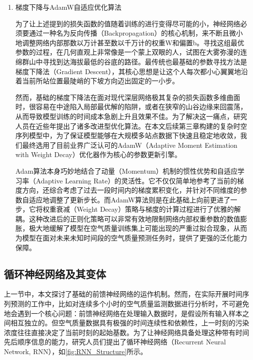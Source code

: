 \begin{enumerate}[label=（\arabic*）, leftmargin=0pt, itemindent=4.5em, labelsep=0.5em, listparindent=2em, parsep=0pt]
    \item 梯度下降与AdamW自适应优化算法
    
    为了让上述提到的损失函数的值随着训练的进行变得尽可能的小，神经网络必须要通过一种名为反向传播（Backpropagation）的核心机制，来不断且微小地调整网络内部那数以万计甚至数以千万计的权重W和偏置b。寻找这组最优参数的过程，在几何直观上非常像是一个蒙上双眼的人，试图在大雾弥漫的连绵群山中寻找到达海拔最低的谷底的路径。最传统也最基础的参数寻找方法是梯度下降法（Gradient Descent），其核心思想是让这个人每次都小心翼翼地沿着当前所站位置最陡峭的下坡方向迈出固定的一小步。

    然而，基础的梯度下降法在面对现代深层网络极其复杂的损失函数多维曲面时，很容易在中途陷入局部最优解的陷阱，或者在狭窄的山谷边缘来回震荡，从而导致模型训练的时间成本急剧上升且效果不佳。为了解决这一痛点，研究人员在近些年提出了诸多改进型优化算法。在本文后续第三章构建的复杂时空序列模型中，为了保证模型能够在大规模多站点数据下快速且稳定地收敛，我们最终选用了目前业界广泛认可的AdamW（Adaptive Moment Estimation with Weight Decay）优化器作为核心的参数更新引擎。

    Adam算法本身巧妙地结合了动量（Momentum）机制的惯性优势和自适应学习率（Adaptive Learning Rate）的灵活性。它不仅仅简单地参考了当前的梯度方向，还综合考虑了过去一段时间内的梯度累积变化，并针对不同维度的参数自适应地调整了更新步长。而AdamW算法则是在此基础上向前更进了一步，它将权重衰减（Weight Decay）策略与梯度的计算过程进行了优雅的解耦。这种改进后的正则化策略可以非常有效地限制网络内部权重参数的数值膨胀，极大地缓解了模型在空气质量训练集上可能出现的严重过拟合现象，从而为模型在面对未来未知时间段的空气质量预测任务时，提供了更强的泛化能力保障。

\end{enumerate}

\subsection{循环神经网络及其变体}

上一节中，本文探讨了基础的前馈神经网络的运作机制。然而，在实际开展时间序列预测的工作中，比如对连续多个小时的空气质量监测数据进行分析时，不可避免地会遇到一个核心问题：前馈神经网络在处理输入数据时，是假设所有输入样本之间相互独立的。但空气质量数据具有极强的时间连续性和依赖性，上一时刻的污染浓度往往直接决定了当前时刻的起始基数。为了让神经网络具备处理这种带有时间先后顺序信息的能力，研究人员们提出了循环神经网络（Recurrent Neural Network, RNN）\cite{elman_finding_1990}，如\cref{fig:RNN_Structure}所示。


